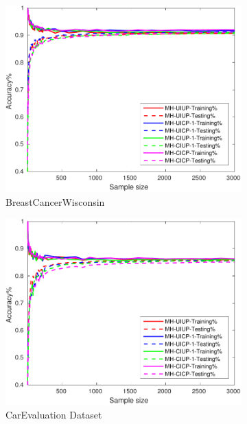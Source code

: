 \begin{figure}[ht]
  \begin{subfigure}[b]{0.3\textwidth}
		\centering
		\includegraphics[width=\textwidth]{figs/PLPTF/Trees/BreastCancerWisconsinDownsampled_Trees_MH.pdf}
		\caption{BreastCancerWisconsin}
		\label{fig:B2}
	\end{subfigure}
  \begin{subfigure}[b]{0.3\textwidth}
		\centering
  	\includegraphics[width=\textwidth]{figs/PLPTF/Trees/CarEvaluation_Trees_MH.pdf}
  	\caption{CarEvaluation Dataset}
		\label{fig:Car2}
	\end{subfigure}
  \begin{subfigure}[b]{0.3\textwidth}

\end{subfigure}
\end{figure}
